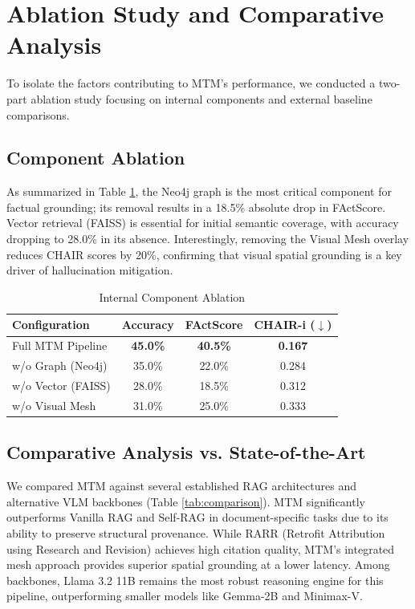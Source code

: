 \documentclass[11pt]{article}
\begin{document}
\section{Ablation Study and Comparative Analysis}
To isolate the factors contributing to MTM's performance, we conducted a two-part ablation study focusing on internal components and external baseline comparisons.

\subsection{Component Ablation}
As summarized in Table \ref{tab:ablation}, the Neo4j graph is the most critical component for factual grounding; its removal results in a 18.5\% absolute drop in FActScore. Vector retrieval (FAISS) is essential for initial semantic coverage, with accuracy dropping to 28.0\% in its absence. Interestingly, removing the Visual Mesh overlay reduces CHAIR scores by 20\%, confirming that visual spatial grounding is a key driver of hallucination mitigation.

\begin{table}[h]
\centering
\caption{Internal Component Ablation}
\label{tab:ablation}
\begin{tabular}{lccc}
\toprule
Configuration & Accuracy & FActScore & CHAIR-i ($\downarrow$) \\
\midrule
Full MTM Pipeline & \textbf{45.0\%} & \textbf{40.5\%} & \textbf{0.167} \\
w/o Graph (Neo4j) & 35.0\% & 22.0\% & 0.284 \\
w/o Vector (FAISS) & 28.0\% & 18.5\% & 0.312 \\
w/o Visual Mesh & 31.0\% & 25.0\% & 0.333 \\
\bottomrule
\end{tabular}
\end{table}

\subsection{Comparative Analysis vs. State-of-the-Art}
We compared MTM against several established RAG architectures and alternative VLM backbones (Table \ref{tab:comparison}). MTM significantly outperforms Vanilla RAG and Self-RAG in document-specific tasks due to its ability to preserve structural provenance. While RARR (Retrofit Attribution using Research and Revision) achieves high citation quality, MTM's integrated mesh approach provides superior spatial grounding at a lower latency. Among backbones, Llama 3.2 11B remains the most robust reasoning engine for this pipeline, outperforming smaller models like Gemma-2B and Minimax-V.
\end{document}
